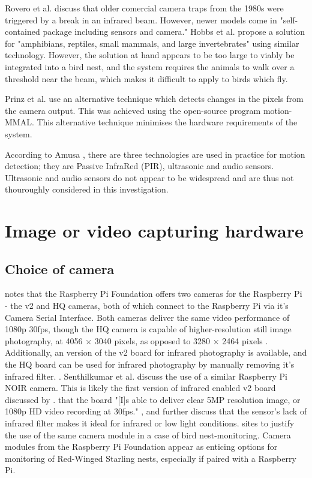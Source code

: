 \documentclass[class=report,11pt,crop=false]{standalone}
\begin{document}
Rovero et al. \cite{rovero2013which} discuss that older comercial camera traps from the 1980s were triggered by a break in an infrared beam. However, newer models come in "self-contained package including sensors and camera." Hobbs et al. propose a solution for "amphibians, reptiles, small mammals, and large invertebrates" \cite{hobbs2017an} using similar technology. However, the solution at hand appears to be too large to viably be integrated into a bird nest, and the system requires the animals to walk over a threshold near the beam, which makes it difficult to apply to birds which fly.

Prinz et al. \cite{prinz2016a} use an alternative technique which detects changes in the pixels from the camera output. This was achieved using the open-source program motion-MMAL. This alternative technique minimises the hardware requirements of the system.

According to Amusa \cite{amusa2015pyro}, there are three technologies are used in practice for motion detection; they are Passive InfraRed (PIR), ultrasonic and audio sensors. Ultrasonic and audio sensors do not appear to be widespread and are thus not thouroughly considered in this investigation.


\section{Image or video capturing hardware}

\subsection{Choice of camera}

\cite{jolles2021broad-scale} notes that the Raspberry Pi Foundation offers two cameras for the Raspberry Pi - the v2 and HQ cameras, both of which connect to the Raspberry Pi via it's Camera Serial Interface. Both cameras deliver the same video performance of 1080p 30fps, though the HQ camera is capable of higher-resolution still image photography, at 4056 × 3040 pixels, as opposed to 3280 × 2464 pixels \cite{jolles2021broad-scale}. Additionally, an version of the v2 board for infrared photography is available, and the HQ board can be used for infrared photography by manually removing it's infrared filter. \cite{jolles2021broad-scale}. Senthilkumar et al. \cite{senthilkumar2014embedded} discuss the use of a similar Raspberry Pi NOIR camera. This is likely the first version of infrared enabled v2 board discussed by \cite{jolles2021broad-scale}. \cite{senthilkumar2014embedded} that the board "[I]s able to deliver clear 5MP resolution image, or 1080p HD video recording at 30fps." \cite{senthilkumar2014embedded}, and further discuss that the sensor's lack of infrared filter makes it ideal for infrared or low light conditions. \cite{prinz2016a} sites \cite{senthilkumar2014embedded} to justify the use of the same camera module in a case of bird nest-monitoring. Camera modules from the Raspberry Pi Foundation appear as enticing options for monitoring of Red-Winged Starling nests, especially if paired with a Raspberry Pi.
\end{document}
